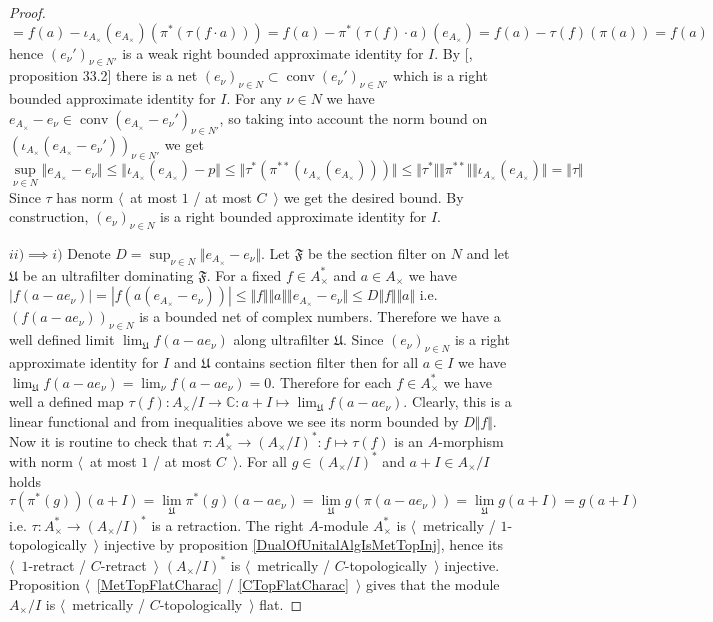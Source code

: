 \begin{proof}
$$=f(a)-\iota_{A_\times }(e_{A_\times })(\pi^*(\tau(f\cdot a)))
=f(a)-\pi^*(\tau(f)\cdot a)(e_{A_\times })
=f(a)-\tau(f)(\pi(a))
=f(a)
$$
hence $(e_\nu')_{\nu\in N'}$ is a weak right bounded approximate identity for $I$. By [\cite{AppIdAndFactorInBanAlg}, proposition 33.2] there is a net $(e_\nu)_{\nu\in N}\subset\operatorname{conv}(e_\nu')_{\nu\in N'}$ which is a right bounded approximate identity for $I$. For any $\nu\in N$ we have $e_{A_\times }-e_\nu\in\operatorname{conv}(e_{A_\times }-e_\nu')_{\nu\in N'}$, so taking into account the norm bound on $(\iota_{A_\times }(e_{A_\times }-e_\nu'))_{\nu\in N'}$ we get 
$$
\sup_{\nu\in N}\Vert e_{A_\times }-e_\nu\Vert
\leq\Vert \iota_{A_\times }(e_{A_\times })-p\Vert
\leq\Vert\tau^*(\pi^{**}(\iota_{A_\times }(e_{A_\times })))\Vert
\leq\Vert\tau^*\Vert\Vert\pi^{**}\Vert\Vert\iota_{A_\times }(e_{A_\times })\Vert=\Vert\tau\Vert
$$
Since $\tau$ has norm $\langle$~at most $1$ / at most $C$~$\rangle$ we get the desired bound. By construction, $(e_\nu)_{\nu\in N}$ is a right bounded approximate identity for $I$.

$ii)$$\implies$$ i)$ Denote $D=\sup_{\nu\in N}\Vert e_{A_\times }-e_\nu\Vert$. Let $\mathfrak{F}$ be the section filter on $N$ and let $\mathfrak{U}$ be an ultrafilter dominating $\mathfrak{F}$. For a fixed $f\in A_\times ^*$ and $a\in A_\times $ we have $|f(a-a e_\nu)|=|f(a(e_{A_\times }-e_\nu))|\leq\Vert f\Vert\Vert a\Vert\Vert e_{A_\times }-e_\nu\Vert\leq D\Vert f\Vert\Vert a\Vert$ i.e. $(f(a-ae_\nu))_{\nu\in N}$ is a bounded net of complex numbers. Therefore we have a well defined limit $\lim_{\mathfrak{U}}f(a-ae_\nu)$ along ultrafilter $\mathfrak{U}$. Since $(e_\nu)_{\nu\in N}$ is a right approximate identity for $I$ and $\mathfrak{U}$ contains section filter then for all $a\in I$ we have $\lim_{\mathfrak{U}}f(a-ae_\nu)=\lim_{\nu}f(a-ae_\nu)=0$. Therefore for each $f\in A_\times ^*$ we have well a defined map $\tau(f):A_\times /I\to \mathbb{C}:a+I\mapsto \lim_{\mathfrak{U}} f(a-ae_\nu)$. Clearly, this is a linear functional and from inequalities above we see its norm bounded by $D\Vert f\Vert$. Now it is routine to check that $\tau:A_\times ^*\to (A_\times /I)^*:f\mapsto \tau(f)$ is an $A$-morphism with norm $\langle$~at most $1$ / at most $C$~$\rangle$. For all $g\in(A_\times /I)^*$ and $a+I\in A_\times /I$ holds
$$
\tau(\pi^*(g))(a+I)
=\lim_{\mathfrak{U}}\pi^*(g)(a-ae_\nu)
=\lim_{\mathfrak{U}} g(\pi(a-ae_\nu))
=\lim_{\mathfrak{U}} g(a+I)
=g(a+I)
$$
i.e. $\tau:A_\times ^*\to (A_\times /I)^*$ is a retraction. The right $A$-module $A_\times ^*$ is $\langle$~metrically / $1$-topologically~$\rangle$ injective by proposition \ref{DualOfUnitalAlgIsMetTopInj}, hence its $\langle$~$1$-retract / $C$-retract~$\rangle$ $(A_\times /I)^*$ is $\langle$~metrically / $C$-topologically~$\rangle$ injective. Proposition $\langle$~\ref{MetTopFlatCharac} / \ref{CTopFlatCharac}~$\rangle$ gives that the module $A_\times /I$ is $\langle$~metrically / $C$-topologically~$\rangle$ flat.
\end{proof}

